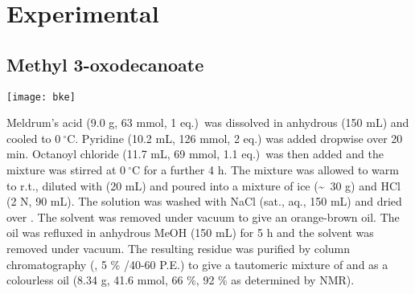\newpage

\section{Experimental}

\subsection{Methyl 3-oxodecanoate }

\begin{scheme}[H]
	\begin{center}
		\texttt{[image: bke]}
	\end{center}
\end{scheme}

Meldrum's acid (9.0 g, 63 mmol, 1 eq.)\ was dissolved in anhydrous  (150 mL) and cooled to $0\ ^{\circ}$C. Pyridine (10.2 mL, 126 mmol, 2 eq.) was added dropwise over 20 min. Octanoyl chloride (11.7 mL, 69 mmol, 1.1 eq.)\ was then added and the mixture was stirred at $0\ ^{\circ}$C for a further 4 h. 
The mixture was allowed to warm to r.t., diluted with  (20 mL) and poured into a mixture of ice (\textasciitilde ~30 g) and HCl (2 N, 90 mL). The solution was washed with NaCl (sat., aq., 150 mL) and dried over . The solvent was removed under vacuum to give an orange-brown oil.
The oil was refluxed in anhydrous MeOH (150 mL) for 5 h and the solvent was removed under vacuum. The resulting residue was purified by column chromatography (, 5 \% /40-60 P.E.) to give a tautomeric mixture of  and  as a colourless oil (8.34 g, 41.6 mmol, 66 \%, 92 \% 
 as determined by NMR).
\\[1\baselineskip]
